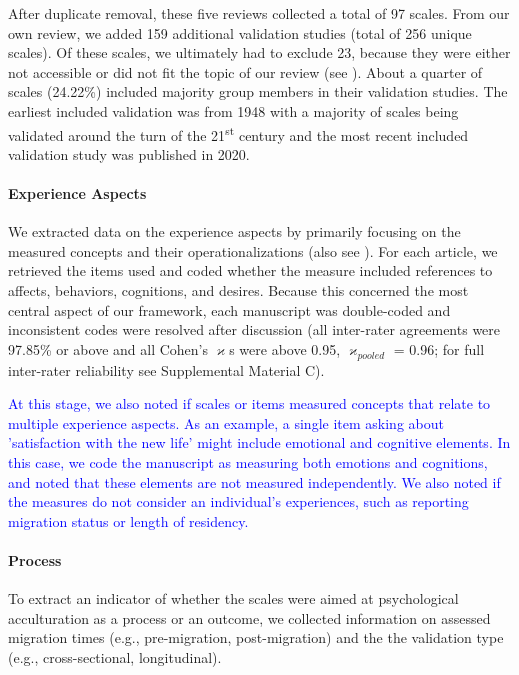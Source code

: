 After duplicate removal, these five reviews collected a total of 97
scales. From our own review, we added 159 additional validation studies
(total of 256 unique scales). Of these scales, we ultimately had to
exclude 23, because they were either not accessible or did not fit the
topic of our review (see ). About a
quarter of scales (24.22\%) included majority group members in their
validation studies. The earliest included validation was from 1948 with
a majority of scales being validated around the turn of the
21\textsuperscript{st} century and the most recent included validation
study was published in 2020.

\paragraph{Experience Aspects}

We extracted data on the experience aspects by primarily focusing on the
measured concepts and their operationalizations (also see
). For each article, we retrieved the items
used and coded whether the measure included references to affects,
behaviors, cognitions, and desires. Because this concerned the most
central aspect of our framework, each manuscript was double-coded and
inconsistent codes were resolved after discussion (all inter-rater
agreements were 97.85\% or above and all Cohen's \(\varkappa\)s were
above 0.95, \(\varkappa_{pooled}\) = 0.96; for full inter-rater
reliability see Supplemental Material C).

\textcolor{blue}{At this stage, we also noted if scales or items measured concepts that relate to multiple experience aspects. As an example, a single item asking about 'satisfaction with the new life' might include emotional and cognitive elements. In this case, we code the manuscript as measuring both emotions and cognitions, and noted that these elements are not measured independently. We also noted if the measures do not consider an individual's experiences, such as reporting migration status or length of residency.}

\paragraph{Process}

To extract an indicator of whether the scales were aimed at
psychological acculturation as a process or an outcome, we collected
information on assessed migration times (e.g., pre-migration,
post-migration) and the the validation type (e.g., cross-sectional,
longitudinal).

